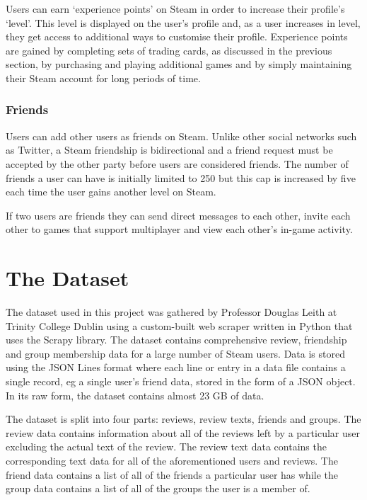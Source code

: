 Users can earn `experience points' on Steam in order to increase their profile's `level'. This level is displayed on the user's profile and, as a user increases in level, they get access to additional ways to customise their profile. Experience points are gained by completing sets of trading cards, as discussed in the previous section, by purchasing and playing additional games and by simply maintaining their Steam account for long periods of time.

\subsubsection{Friends}

Users can add other users as friends on Steam. Unlike other social networks such as Twitter, a Steam friendship is bidirectional and a friend request must be accepted by the other party before users are considered friends. The number of friends a user can have is initially limited to 250 but this cap is increased by five each time the user gains another level on Steam.

If two users are friends they can send direct messages to each other, invite each other to games that support multiplayer and view each other's in-game activity.

\section{The Dataset} \label{sec:BG_Dataset}

The dataset used in this project was gathered by Professor Douglas Leith at Trinity College Dublin using a custom-built web scraper written in Python that uses the Scrapy library. The dataset contains comprehensive review, friendship and group membership data for a large number of Steam users. Data is stored using the JSON Lines format where each line or entry in a data file contains a single record, eg a single user's friend data, stored in the form of a JSON object. In its raw form, the dataset contains almost 23 GB of data.

The dataset is split into four parts: reviews, review texts, friends and groups. The review data contains information about all of the reviews left by a particular user excluding the actual text of the review. The review text data contains the corresponding text data for all of the aforementioned users and reviews. The friend data contains a list of all of the friends a particular user has while the group data contains a list of all of the groups the user is a member of.

